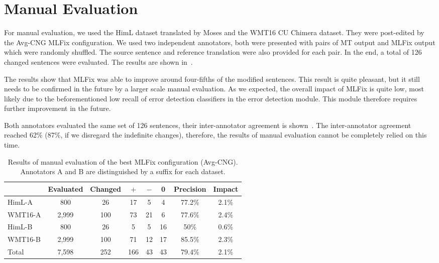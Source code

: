 \section{Manual Evaluation}

For manual evaluation, we used the HimL dataset translated by Moses and the WMT16 CU Chimera dataset.
They were post-edited by the Avg-CNG MLFix configuration.
We used two independent annotators, both were presented with pairs
of MT output and MLFix output which were randomly shuffled. The source sentence and reference translation were also provided for each pair.
In the end, a total of 126 changed sentences were evaluated. The results are shown in~.

The results show that MLFix was able to improve around four-fifths of the modified sentences. This
result is quite pleasant, but it still needs to be confirmed in the future by a larger scale manual
evaluation. As we expected, the overall impact of MLFix is quite low, most likely due to the beforementioned
low recall of error detection classifiers in the error detection module.
This module therefore requires further improvement in the future.

Both annotators evaluated the same set of 126 sentences, their inter-annotator agreement is shown~.
The inter-annotator agreement reached 62\% (87\%, if we disregard the indefinite changes),
therefore, the results of manual evaluation cannot be completely relied on this time.

\begin{table*}[t]
\centering
\small

\begin{tabular}{l|cc|ccc|cc}
  &  Evaluated  &  Changed  &  $+$  &  $-$  &  0  &  Precision  &  Impact  \\
\hline
HimL-A  &  800  &  26  &  17  &  5  &  4  &  77.2\%  &  2.1\%  \\
WMT16-A  &  2,999  &  100  &  73  &  21  &  6  &  77.6\%  &  2.4\%  \\
HimL-B  &  800  &  26  &  5  &  5  &  16  &  50\%  &  0.6\%  \\
WMT16-B  &  2,999  &  100  &  71  &  12  &  17  &  85.5\%  &  2.3\%  \\
\hline
Total &  7,598  &  252  &  166  &  43  &  43  &  79.4\%  &  2.1\%  \\
\end{tabular}
\caption[Czech MLFix manual evaluation]{
Results of manual evaluation of the best MLFix configuration (Avg-CNG). Annotators
A and B are distinguished by a suffix for each dataset.
}
\label{maneval-final}
\end{table*}


